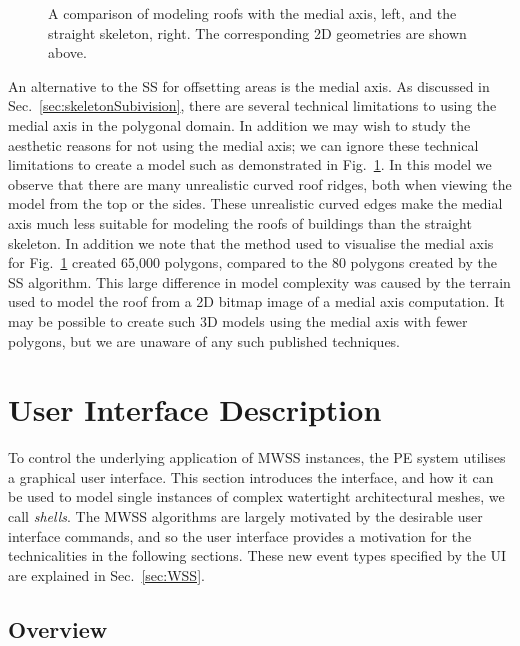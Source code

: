 \begin{figure}
  \centering
  \def\svgwidth{0.6\columnwidth}
  
  \caption[Modeling building roofs with the medial axis.]{\label{fig:vsmedial}A comparison of modeling roofs with the medial axis, left, and the straight skeleton, right. The corresponding 2D geometries are shown above.}
\end{figure}

An alternative to the SS for offsetting areas is the medial axis\cite{Blum67}. As discussed in Sec.~\ref{sec:skeletonSubivision}, there are several technical limitations to using the medial axis in the polygonal domain. In addition we may wish to study the aesthetic reasons for not using the medial axis; we can ignore these technical limitations to create a model such as demonstrated in Fig.~\ref{fig:vsmedial}. In this model we observe that there are many unrealistic curved roof ridges, both when viewing the model from the top or the sides. These unrealistic curved edges make the medial axis much less suitable for modeling the roofs of buildings than the straight skeleton. In addition we note that the method used to visualise the medial axis for Fig.~\ref{fig:vsmedial} created 65,000 polygons, compared to the 80 polygons created by the SS algorithm. This large difference in model complexity was caused by the terrain used to model the roof from a 2D bitmap image of a medial axis computation. It may be possible to create such 3D models using the medial axis with fewer polygons, but we are unaware of any such published techniques.


\section{User Interface Description}
\label{sec:UI}

To control the underlying application of MWSS instances, the PE system utilises a graphical user interface. This section introduces the interface, and how it can be used to model single instances of complex watertight architectural meshes, we call \emph{shells}. The MWSS algorithms are largely motivated by the desirable user interface commands, and so the user interface provides a motivation for the technicalities in the following sections. These new event types specified by the UI are explained in Sec.~\ref{sec:WSS}.

\subsection {Overview}
\label{sec:UI:overview}

